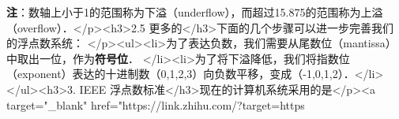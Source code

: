 \textbf{注}：数轴上小于1的范围称为下溢（underflow），而超过15.875的范围称为上溢（overflow）．</p><h3>2.5 更多的</h3>下面的几个步骤可以进一步完善我们的浮点数系统： </p><ul><li>为了表达负数，我们需要从尾数位（mantissa）中取出一位，作为\textbf{符号位}．  </li><li>为了将下溢降低，我们将指数位（exponent）表达的十进制数（0,1,2,3）向负数平移，变成（-1,0,1,2）．</li></ul><h3>3. IEEE 浮点数标准</h3>现在的计算机系统采用的是</p><a target="_blank" href="https://link.zhihu.com/?target=https%

